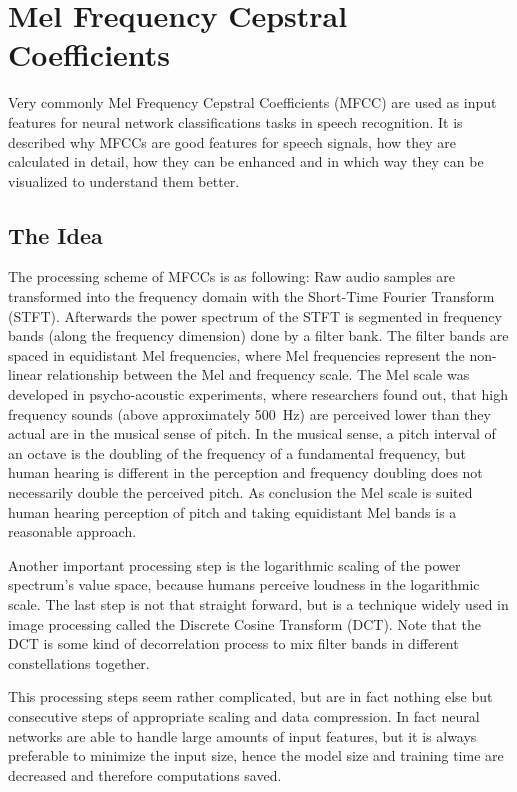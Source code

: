 
\section{Mel Frequency Cepstral Coefficients}\label{sec:signal_mfcc}
\thesisStateNotReady
Very commonly Mel Frequency Cepstral Coefficients (MFCC) are used as input features for neural network classifications tasks in speech recognition.
It is described why MFCCs are good features for speech signals, how they are calculated in detail, how they can be enhanced and in which way they can be visualized to understand them better.



\subsection{The Idea}
The processing scheme of MFCCs is as following:
Raw audio samples are transformed into the frequency domain with the Short-Time Fourier Transform (STFT).
Afterwards the power spectrum of the STFT is segmented in frequency bands (along the frequency dimension) done by a filter bank.
The filter bands are spaced in equidistant Mel frequencies, where Mel frequencies represent the non-linear relationship between the Mel and frequency scale.
The Mel scale was developed in psycho-acoustic experiments, where researchers found out, that high frequency sounds (above approximately \SI{500}{\hertz}) are perceived lower than they actual are in the musical sense of pitch.
In the musical sense, a pitch interval of an octave is the doubling of the frequency of a fundamental frequency, but human hearing is different in the perception and frequency doubling does not necessarily double the perceived pitch.
As conclusion the Mel scale is suited human hearing perception of pitch and taking equidistant Mel bands is a reasonable approach.

Another important processing step is the logarithmic scaling of the power spectrum's value space, because humans perceive loudness in the logarithmic scale.
The last step is not that straight forward, but is a technique widely used in image processing called the Discrete Cosine Transform (DCT).
Note that the DCT is some kind of decorrelation process to mix filter bands in different constellations together.

This processing steps seem rather complicated, but are in fact nothing else but consecutive steps of appropriate scaling and data compression.
In fact neural networks are able to handle large amounts of input features, but it is always preferable to minimize the input size, hence the model size and training time are decreased and therefore computations saved.


